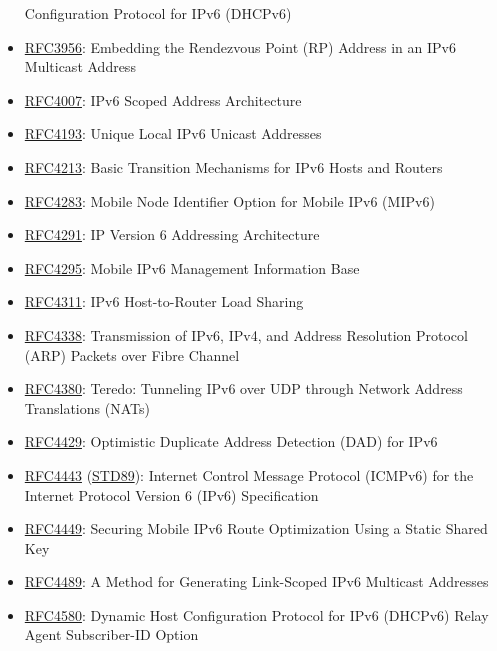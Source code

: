 \documentclass[
]{article}
\begin{document}
\begin{itemize}
  Configuration Protocol for IPv6 (DHCPv6)
\item
  \href{https://www.rfc-editor.org/info/rfc3956}{RFC3956}: Embedding the
  Rendezvous Point (RP) Address in an IPv6 Multicast Address
\item
  \href{https://www.rfc-editor.org/info/rfc4007}{RFC4007}: IPv6 Scoped
  Address Architecture
\item
  \href{https://www.rfc-editor.org/info/rfc4193}{RFC4193}: Unique Local
  IPv6 Unicast Addresses
\item
  \href{https://www.rfc-editor.org/info/rfc4213}{RFC4213}: Basic
  Transition Mechanisms for IPv6 Hosts and Routers
\item
  \href{https://www.rfc-editor.org/info/rfc4283}{RFC4283}: Mobile Node
  Identifier Option for Mobile IPv6 (MIPv6)
\item
  \href{https://www.rfc-editor.org/info/rfc4291}{RFC4291}: IP Version 6
  Addressing Architecture
\item
  \href{https://www.rfc-editor.org/info/rfc4295}{RFC4295}: Mobile IPv6
  Management Information Base
\item
  \href{https://www.rfc-editor.org/info/rfc4311}{RFC4311}: IPv6
  Host-to-Router Load Sharing
\item
  \href{https://www.rfc-editor.org/info/rfc4338}{RFC4338}: Transmission
  of IPv6, IPv4, and Address Resolution Protocol (ARP) Packets over
  Fibre Channel
\item
  \href{https://www.rfc-editor.org/info/rfc4380}{RFC4380}: Teredo:
  Tunneling IPv6 over UDP through Network Address Translations (NATs)
\item
  \href{https://www.rfc-editor.org/info/rfc4429}{RFC4429}: Optimistic
  Duplicate Address Detection (DAD) for IPv6
\item
  \href{https://www.rfc-editor.org/info/rfc4443}{RFC4443}
  (\href{https://www.rfc-editor.org/info/std89}{STD89}): Internet
  Control Message Protocol (ICMPv6) for the Internet Protocol Version 6
  (IPv6) Specification
\item
  \href{https://www.rfc-editor.org/info/rfc4449}{RFC4449}: Securing
  Mobile IPv6 Route Optimization Using a Static Shared Key
\item
  \href{https://www.rfc-editor.org/info/rfc4489}{RFC4489}: A Method for
  Generating Link-Scoped IPv6 Multicast Addresses
\item
  \href{https://www.rfc-editor.org/info/rfc4580}{RFC4580}: Dynamic Host
  Configuration Protocol for IPv6 (DHCPv6) Relay Agent Subscriber-ID
  Option

\end{itemize}
\end{document}

